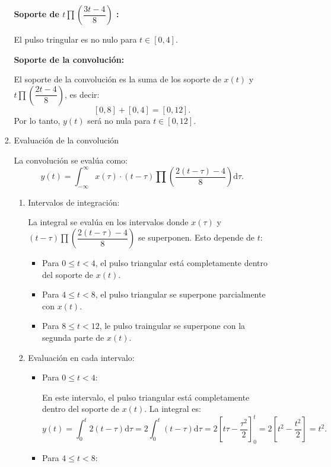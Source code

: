 \begin{enumerate}[label=\color{red}\textbf{\arabic*)}]
\begin{enumerate}[label=\color{red}\textbf{\alph*)}]
\begin{enumerate}[label=Paso \arabic*:]
                \textbf{Soporte de $t\prod\left( \dfrac{3t-4}{8} \right) $ :} 

                El pulso tringular es no nulo para $t\in [0,4]$.

                \textbf{Soporte de la convolución:}

                El soporte de la convolución es la suma de los soporte de $x(t)$ y $t\prod\left( \dfrac{2t-4}{8} \right) $, es decir: \[
                    [0,8]+[0,4]=[0,12].
                \] 
                Por lo tanto, $y(t)$ será no nula para $t\in [0,12]$.
            \item Evaluación de la convolución

                La convolución se evalúa como: \[
                y(t)=\int_{-\infty}^{\infty} x(\tau)\cdot (t-\tau)\prod\left( \dfrac{2(t-\tau)-4}{8} \right) \mathrm{d}\tau. 
                \] 
                \begin{enumerate}[label=\alph*)]
                    \item Intervalos de integración:

                        La integral se evalúa en los intervalos donde $x(\tau)$ y $(t-\tau)\prod\left( \dfrac{2(t-\tau)-4}{8} \right) $ se superponen. Esto depende de $t$:
                         \begin{itemize}[label=\textbullet]
                            \item Para $0\le t<4$, el pulso triangular está completamente dentro del soporte de $x(t)$.
                            \item Para  $4\le t<8$, el pulso triangular se superpone parcialmente con $x(t)$.
                            \item Para  $8\le t<12$, le pulso traingular se superpone con la segunda parte de $x(t)$.
                        \end{itemize}
                    \item Evaluación en cada intervalo:
                        \begin{itemize}[label=\textbullet]
                            \item Para $0\le t<4$:

                                En este intervalo, el pulso triangular está completamente dentro del soporte de $x(t)$. La integral es:  \[
                                y(t)=\int_{0}^{t} 2(t-\tau)\mathrm{d}\tau=2 \int_{0}^{t} (t-\tau)\mathrm{d}\tau=2\left[ t \tau-\dfrac{\tau^2}{2} \right] _0^t=2\left[ t^2-\dfrac{t^2}{2} \right] =t^2.  
                                \] 
                            \item Para $4\le t<8$:


\end{itemize}
\end{enumerate}
\end{enumerate}
\end{enumerate}
\end{enumerate}
